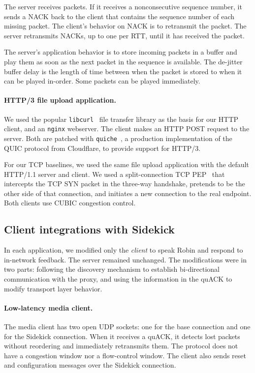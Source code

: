 The server receives packets. If it receives a nonconsecutive sequence number,
it sends a NACK back to the client that contains the sequence number of each
missing packet. The client's behavior on NACK is to retransmit the packet. The
server retransmits NACKs, up to one per RTT, until it has received the packet.

The server's application behavior is to store incoming packets in a buffer
and play them as soon as the next packet in the sequence is available. The
de-jitter buffer delay is the length of time between when the packet is stored
to when it can be played in-order. Some packets can be played immediately.

\paragraph{HTTP/3 file upload application.}
We used the popular \texttt{libcurl}~\cite{libcurl} file transfer library as the basis for
our HTTP client, and an \texttt{nginx} webserver. The client makes an HTTP
POST request to the server. Both are patched with \texttt{quiche}~\cite{quiche}, a production
implementation of the QUIC protocol from Cloudflare, to provide support for
HTTP/3.

For our TCP baselines, we used the same file upload application with the
default HTTP/1.1 server and client. We used a split-connection
TCP PEP~\cite{caini2006pepsal} that intercepts the TCP
SYN packet in the three-way handshake, pretends to be the other side of that
connection, and initiates a new connection to the real endpoint.
Both clients use CUBIC congestion control.

\subsection{Client integrations with Sidekick}
\label{sec:sidekick:implementation:client-integrations}

In each application, we modified only the \emph{client} to speak Robin
and respond to in-network feedback. The server remained unchanged.
The modifications were in two parts: following the discovery mechanism to
establish bi-directional communication with the proxy, and using the information
in the quACK to modify transport layer behavior.



\paragraph{Low-latency media client.} The media client has two open UDP sockets:
one for the base connection and one for the Sidekick connection. When it receives a
quACK, it detects lost packets without reordering and immediately retransmits
them. The protocol does not have a congestion window nor a flow-control window.
The client also sends reset and configuration messages over the Sidekick connection.

